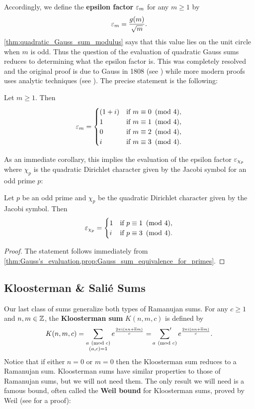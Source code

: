       Accordingly, we define the \textbf{epsilon factor} $\varepsilon_{m}$ for any $m \ge 1$ by
      \[
        \varepsilon_{m} = \frac{g(m)}{\sqrt{m}}.
      \]
      \cref{thm:quadratic_Gauss_sum_modulus} says that this value lies on the unit circle when $m$ is odd. Thus the question of the evaluation of quadratic Gauss sums reduces to determining what the epsilon factor is. This was completely resolved and the original proof is due to Gauss in 1808 (see \cite{Gauss1808summatio}) while more modern proofs uses analytic techniques (see \cite{lang1994algebraic}). The precise statement is the following:

      \begin{theorem}\label{thm:Gauss's_evaluation}
        Let $m \ge 1$. Then
        \[
          \varepsilon_{m} = \begin{cases} (1+i) & \text{if $m \equiv 0 \ \left(\text{mod }4\right)$}, \\ 1 & \text{if $m \equiv 1 \ \left(\text{mod }4\right)$}, \\ 0 & \text{if $m \equiv 2 \ \left(\text{mod }4\right)$}, \\ i & \text{if $m \equiv 3 \ \left(\text{mod }4\right)$}. \end{cases}
        \]
      \end{theorem}

      As an immediate corollary, this implies the evaluation of the epsilon factor $\varepsilon_{\chi_{p}}$ where $\chi_{p}$ is the quadratic Dirichlet character given by the Jacobi symbol for an odd prime $p$:

      \begin{corollary}
        Let $p$ be an odd prime and $\chi_{p}$ be the quadratic Dirichlet character given by the Jacobi symbol. Then
        \[
          \varepsilon_{\chi_{p}} = \begin{cases} 1 & \text{if $p \equiv 1 \ \left(\text{mod }4\right)$}, \\ i & \text{if $p \equiv 3 \ \left(\text{mod }4\right)$}. \end{cases}
        \]
      \end{corollary}
      \begin{proof}
        The statement follows immediately from \cref{thm:Gauss's_evaluation,prop:Gauss_sum_equivalence_for_primes}.
      \end{proof}
    \subsection*{Kloosterman \& Sali\'e Sums}
      Our last class of sums generalize both types of Ramanujan sums. For any $c \ge 1$ and $n,m \in \mathbb{Z}$, the \textbf{Kloosterman sum} $K(n,m,c)$ is defined by
      \[
        K(n,m,c) = \sum_{\substack{a \ \left(\text{mod }c\right) \\ (a,c) = 1}}e^{\frac{2\pi i(an+\overline{a}m)}{c}} = \sideset{}{'}\sum_{a \ \left(\text{mod }c\right)}e^{\frac{2\pi i(an+\overline{a}m)}{c}}.
      \]
      Notice that if either $n = 0$ or $m = 0$ then the Kloosterman sum reduces to a Ramanujan sum. Kloosterman sums have similar properties to those of Ramanujan sums, but we will not need them. The only result we will need is a famous bound, often called the \textbf{Weil bound} for Kloosterman sums, proved by Weil (see \cite{weil1948some} for a proof):

